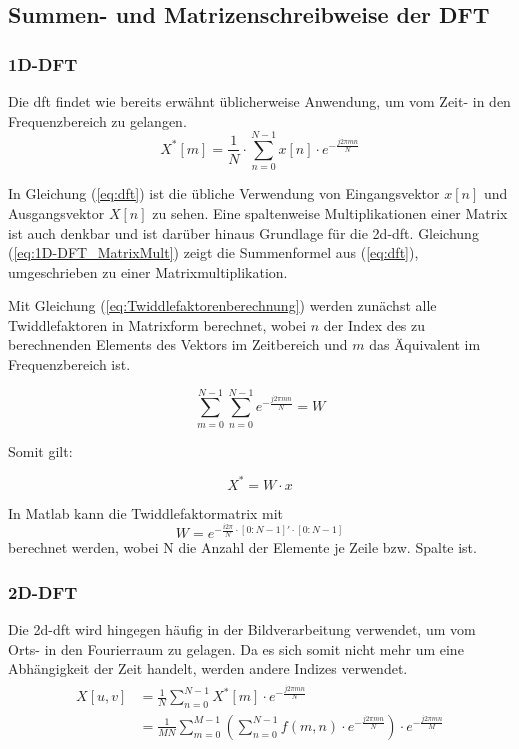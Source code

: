 \subsection{Summen- und Matrizenschreibweise der DFT}
\subsubsection{1D-DFT}
Die \gls{dft} findet wie bereits erwähnt üblicherweise Anwendung, um vom Zeit- in den Frequenzbereich zu gelangen.
\begin{equation}\label{eq:dft}
 X^* \left[ m \right] = \frac{1}{N} \cdot \sum^{N-1}_{n=0} x[n] \cdot e^{-\frac{j 2 \pi m n}{N}}
\end{equation}


In Gleichung (\ref{eq:dft}) ist die übliche Verwendung von Eingangsvektor $x[n]$ und Ausgangsvektor $X[n]$ zu sehen. Eine spaltenweise Multiplikationen einer Matrix
ist auch denkbar und ist darüber hinaus Grundlage für die \gls{2d-dft}.
Gleichung (\ref{eq:1D-DFT_MatrixMult}) zeigt die Summenformel aus (\ref{eq:dft}), umgeschrieben zu einer Matrixmultiplikation.

Mit Gleichung (\ref{eq:Twiddlefaktorenberechnung}) werden zunächst alle Twiddlefaktoren in Matrixform berechnet, wobei $n$ der Index des zu berechnenden Elements des 
Vektors im Zeitbereich und $m$ das Äquivalent im Frequenzbereich ist.

\begin{equation}\label{eq:Twiddlefaktorenberechnung}
\sum^{N-1 }_{m=0} \sum^{N-1 }_{n=0} e^{-\frac{j 2 \pi m n}{N}} = W
\end{equation}


Somit gilt:

\begin{equation}\label{eq:1D-DFT_MatrixMult}
X^* = W \cdot x
\end{equation}

In Matlab kann die Twiddlefaktormatrix mit
\begin{equation}\label{eq:matlab_dft_faktoren}
 W = e^{-\frac{i 2 \pi}{N}\cdot[0:N-1]'\cdot[0:N-1]}
\end{equation}
berechnet werden, wobei N die Anzahl der Elemente je Zeile bzw. Spalte ist.


\subsubsection{2D-DFT}
Die \gls{2d-dft} wird hingegen häufig in der Bildverarbeitung verwendet, um vom Orts- in den Fourierraum zu gelagen. Da es sich somit nicht mehr um eine Abhängigkeit 
der Zeit handelt, werden andere Indizes verwendet.
\begin{align}
\begin{split}
X[u,v] 	&= \frac{1}{N} \sum^{N-1}_{n=0} X^* \left[ m \right] \cdot e^{-\frac{j 2 \pi m n}{N}}\\
	&= \frac{1}{MN} \sum^{M-1}_{m=0} \left( \sum^{N-1}_{n=0} f(m,n) \cdot e^{-\frac{j 2 \pi m n}{N}} \right) \cdot e^{-\frac{j 2 \pi m n}{M}}
\end{split}
\end{align}

